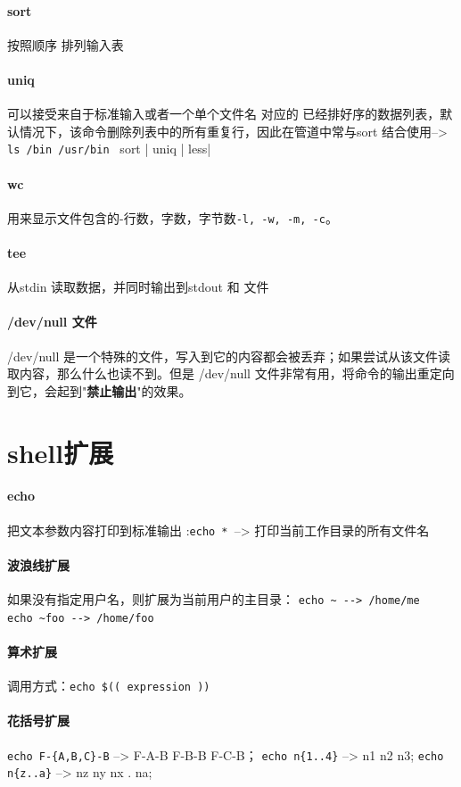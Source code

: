 \documentclass[UTF8,a4paper,12pt]{ctexbook}
\begin{document}
		\paragraph{sort}按照顺序 排列输入表
		\paragraph{uniq}可以接受来自于标准输入或者一个单个文件名 对应的 已经排好序的数据列表，默认情况下，该命令删除列表中的所有重复行，因此在管道中常与sort 结合使用--> \verb|ls /bin /usr/bin | sort | uniq | less|
		\paragraph{wc}用来显示文件包含的-行数，字数，字节数\verb|-l, -w, -m, -c|。
		\paragraph{tee}从stdin 读取数据，并同时输出到stdout 和 文件
		\paragraph{/dev/null 文件}/dev/null 是一个特殊的文件，写入到它的内容都会被丢弃；如果尝试从该文件读取内容，那么什么也读不到。但是 /dev/null 文件非常有用，将命令的输出重定向到它，会起到"\textbf{禁止输出}"的效果。
	\section{shell扩展}
		\paragraph{echo}把文本参数内容打印到标准输出 :\verb|echo * |--> 打印当前工作目录的所有文件名
		\paragraph{波浪线扩展}如果没有指定用户名，则扩展为当前用户的主目录： \verb|echo ~ --> /home/me   |  \verb|echo ~foo --> /home/foo|
		\paragraph{算术扩展}调用方式：\verb|echo $(( expression ))|
		\paragraph{花括号扩展}\verb|echo F-{A,B,C}-B| --> F-A-B F-B-B F-C-B； \verb|echo n{1..4}| --> n1 n2 n3; 	\verb|echo n{z..a}| --> nz ny nx . na;
\end{document}
